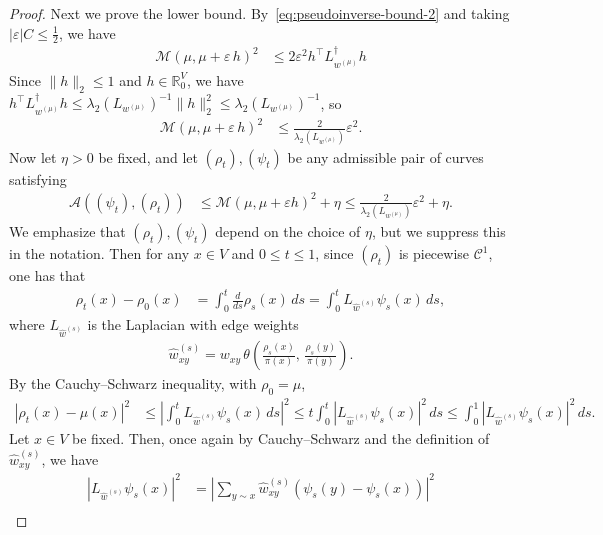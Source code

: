 \documentclass[10pt,a4paper]{amsart}
\newcommand{\Maas}{\mathcal{M}}
\begin{document}
\begin{proof}
    Next we prove the lower bound. By~\cref{eq:pseudoinverse-bound-2} and taking $|\varepsilon|C\le \frac12$, we have
        \begin{align*}
            \Maas(\mu, \mu+\varepsilon \, h)^2 &\leq 2\varepsilon^2 h^\top L_{w^{(\mu)}}^{\dagger} h 
        \end{align*}
    Since $\|h\|_2\le 1$ and $h\in\mathbb{R}^{V}_0$, we have $h^\top L_{w^{(\mu)}}^{\dagger} h \le \lambda_2(L_{w^{(\mu)}})^{-1}\|h\|_2^2 \le \lambda_2(L_{w^{(\mu)}})^{-1}$, so
        \begin{align*}
            \Maas(\mu, \mu+\varepsilon \, h)^2 &\leq \frac{2}{\lambda_2(L_{w^{(\mu)}})}\varepsilon^2.
        \end{align*}
    Now let $\eta > 0$ be fixed, and let $(\rho_t), (\psi_t)$ be any admissible pair of curves satisfying
        \begin{align*}
            \mathcal{A}((\psi_t), (\rho_t)) &\leq \Maas(\mu, \mu+\varepsilon h)^2 + \eta \leq \frac{2}{\lambda_2(L_{w^{(\mu)}})}\varepsilon^2 + \eta.
        \end{align*}
    We emphasize that $(\rho_t), (\psi_t)$ depend on the choice of $\eta$, but we suppress this in the notation. Then for any $x\in V$ and $0\le t\le 1$, since $(\rho_t)$ is piecewise $\mathcal{C}^1$, one has that
        \begin{align*}
            \rho_t(x) - \rho_0(x) &= \int_0^t \frac{d}{ds} \rho_s(x) \, ds = \int_0^t L_{\widehat{w}^{(s)}} \psi_s(x) \, ds,
        \end{align*}
    where $L_{\widehat{w}^{(s)}}$ is the Laplacian with edge weights
        \begin{align*}
            \widehat{w}^{(s)}_{xy} = w_{xy}\, \theta\left(\frac{\rho_s(x)}{\pi(x)}, \,\frac{\rho_s(y)}{\pi(y)}\right).
        \end{align*}
    By the Cauchy--Schwarz inequality, with $\rho_0 = \mu$,
        \begin{align}\label{eq:cauchy-schwarz-1}
            |\rho_t(x) - \mu(x)|^2 &\leq \left|\int_0^t L_{\widehat{w}^{(s)}} \psi_s(x) \, ds \right|^2 \leq t \int_0^t |L_{\widehat{w}^{(s)}} \psi_s(x)|^2 \, ds \leq \int_0^1 |L_{\widehat{w}^{(s)}} \psi_s(x)|^2 \, ds.
        \end{align}
    Let $x\in V$ be fixed. Then, once again by Cauchy--Schwarz and the definition of $\widehat{w}^{(s)}_{xy}$, we have
        \begin{align*}
            |L_{\widehat{w}^{(s)}} \psi_s(x)|^2 &= \left|\sum_{y\sim x} \widehat{w}^{(s)}_{xy} (\psi_s(y) - \psi_s(x))\right|^2 \\

\end{align*}
\end{proof}
\end{document}
